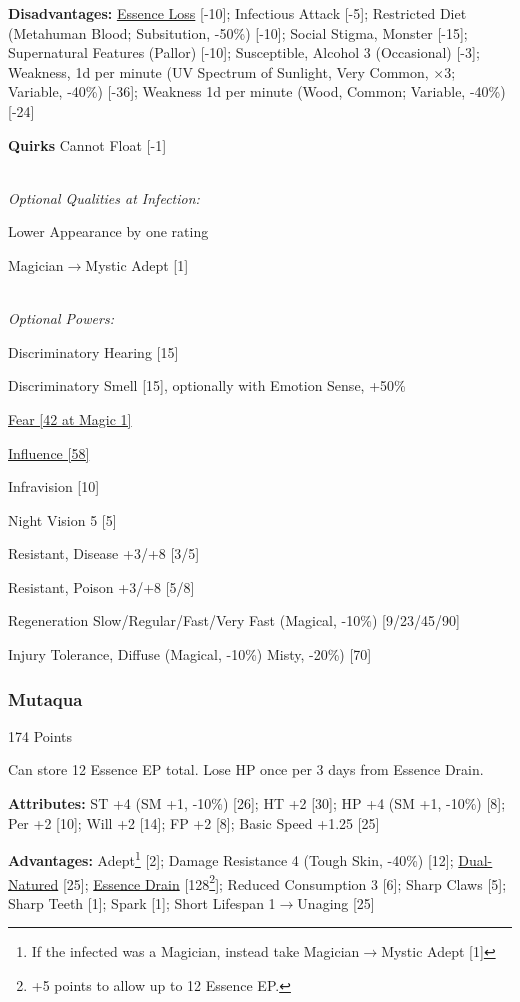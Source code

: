 \begin{multicols*}{3}
	\textbf{Disadvantages:}	
	\hyperref[essence_loss]{Essence Loss} [-10]; Infectious Attack [-5]; Restricted Diet (Metahuman Blood; Subsitution, -50\%) [-10]; Social Stigma, Monster [-15];  Supernatural Features (Pallor) [-10]; Susceptible, Alcohol 3 (Occasional) [-3]; Weakness, 1d per minute (UV Spectrum of Sunlight, Very Common, $\times$3; Variable, -40\%) [-36]; Weakness 1d per minute (Wood, Common; Variable, -40\%) [-24]
	
	\textbf{Quirks} 
	Cannot Float [-1]
	
	\textit{\\Optional Qualities at Infection:}
	
	Lower Appearance by one rating	
	
	Magician$\rightarrow$Mystic Adept [1]
	
	\textit{\\Optional Powers:}
	
	Discriminatory Hearing [15]
	
	Discriminatory Smell [15], optionally with Emotion Sense, +50\%
	
	\hyperref[fear]{Fear [42 at Magic 1]}
	
	\hyperref[influence]{Influence [58]}
	
	Infravision [10]
	
	Night Vision 5 [5]
	
	Resistant, Disease +3/+8 [3/5]
	
	Resistant, Poison +3/+8 [5/8]
	
	Regeneration Slow/Regular/Fast/Very Fast (Magical, -10\%) [9/23/45/90]
	
	Injury Tolerance, Diffuse (Magical, -10\%) Misty, -20\%) [70]
	
	\subsubsection{Mutaqua}\label{mutaqua}
	\begin{flushright}
		174 Points
	\end{flushright}
	
	Can store 12 Essence EP total.
	Lose HP once per 3 days from Essence Drain.
		
	\textbf{Attributes:}
	ST +4 (SM +1, -10\%) [26]; HT +2 [30]; HP +4 (SM +1, -10\%) [8]; Per +2 [10]; Will +2 [14]; FP +2 [8]; Basic Speed +1.25 [25]
	
	\textbf{Advantages:}
	Adept\footnote{If the infected was a Magician, instead take Magician$\rightarrow$Mystic Adept [1]} [2]; Damage Resistance 4 (Tough Skin, -40\%) [12]; \hyperref[dual_natured]{Dual-Natured} [25];  \hyperref[essence_drain]{Essence Drain} [128\footnote{+5 points to allow up to 12 Essence EP.}]; Reduced Consumption 3 [6]; Sharp Claws [5]; Sharp Teeth [1]; Spark [1]; Short Lifespan 1$\rightarrow$Unaging [25]
	

\end{multicols*}
